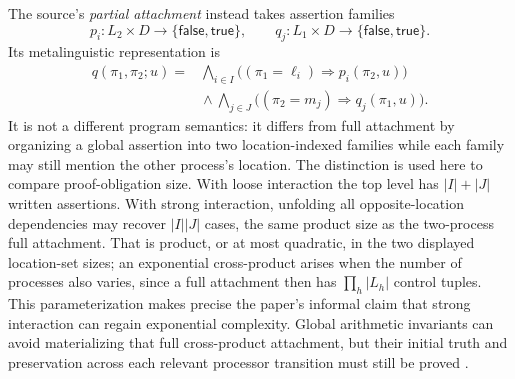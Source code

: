 The source's \emph{partial attachment} instead takes assertion families
\[
 p_i:L_2\times D\to\{\mathsf{false},\mathsf{true}\},
 \qquad
 q_j:L_1\times D\to\{\mathsf{false},\mathsf{true}\}.
\]
Its metalinguistic representation is
\[
\begin{split}
q(\pi_1,\pi_2;u)
={}&\bigwedge_{i\in I}
  \bigl((\pi_1=\ell_i)\Rightarrow p_i(\pi_2,u)\bigr)\\
 &{}\land
 \bigwedge_{j\in J}
  \bigl((\pi_2=m_j)\Rightarrow q_j(\pi_1,u)\bigr).
\end{split}
\]
It is not a different program semantics: it differs from full attachment by
organizing a global assertion into two location-indexed families while each
family may still mention the other process's location.  The distinction is
used here to compare proof-obligation size.  With loose interaction the top
level has \(|I|+|J|\) written assertions.  With strong interaction, unfolding
all opposite-location dependencies may recover \(|I||J|\) cases, the same
product size as the two-process full attachment.  That is product, or at most
quadratic, in the two displayed location-set sizes; an exponential
cross-product arises when the number of processes also varies, since a full
attachment then has \(\prod_h|L_h|\) control tuples.  This parameterization
makes precise the paper's informal claim that strong interaction can regain
exponential complexity.  Global arithmetic invariants can avoid materializing
that full cross-product attachment, but their initial truth and preservation
across each relevant processor transition must still be proved
\cite[p.~51]{Pnueli1977}.

